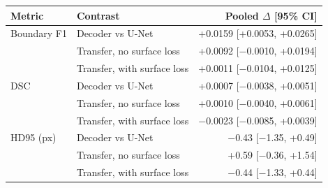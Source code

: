 \begin{tabular*}{\linewidth}{@{\extracolsep{\fill}}llr@{}}
\toprule
Metric & Contrast & Pooled $\Delta$ [95\% CI] \\
\midrule
Boundary F1 & Decoder vs U-Net & +0.0159 [+0.0053, +0.0265] \\
 & Transfer, no surface loss & +0.0092 [$-$0.0010, +0.0194] \\
 & Transfer, with surface loss & +0.0011 [$-$0.0104, +0.0125] \\
\midrule
DSC & Decoder vs U-Net & +0.0007 [$-$0.0038, +0.0051] \\
 & Transfer, no surface loss & +0.0010 [$-$0.0040, +0.0061] \\
 & Transfer, with surface loss & $-$0.0023 [$-$0.0085, +0.0039] \\
\midrule
HD95 (px) & Decoder vs U-Net & $-$0.43 [$-$1.35, +0.49] \\
 & Transfer, no surface loss & +0.59 [$-$0.36, +1.54] \\
 & Transfer, with surface loss & $-$0.44 [$-$1.33, +0.44] \\
\bottomrule
\end{tabular*}
